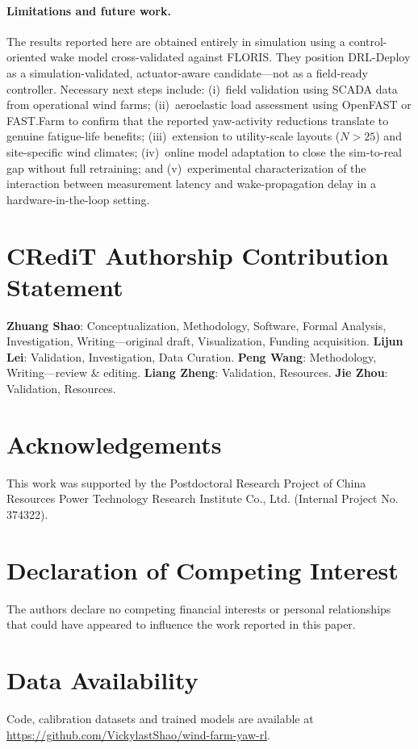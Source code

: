 \documentclass[final,5p,times]{elsarticle}
\begin{document}
\paragraph{Limitations and future work.}
The results reported here are obtained entirely in simulation using a control-oriented wake model cross-validated against FLORIS. They position DRL-Deploy as a simulation-validated, actuator-aware candidate---not as a field-ready controller. Necessary next steps include: (i)~field validation using SCADA data from operational wind farms; (ii)~aeroelastic load assessment using OpenFAST or FAST.Farm to confirm that the reported yaw-activity reductions translate to genuine fatigue-life benefits; (iii)~extension to utility-scale layouts ($N{>}25$) and site-specific wind climates; (iv)~online model adaptation to close the sim-to-real gap without full retraining; and (v)~experimental characterization of the interaction between measurement latency and wake-propagation delay in a hardware-in-the-loop setting.

\section*{CRediT Authorship Contribution Statement}
\textbf{Zhuang Shao}: Conceptualization, Methodology, Software, Formal Analysis, Investigation, Writing---original draft, Visualization, Funding acquisition. \textbf{Lijun Lei}: Validation, Investigation, Data Curation. \textbf{Peng Wang}: Methodology, Writing---review \& editing. \textbf{Liang Zheng}: Validation, Resources. \textbf{Jie Zhou}: Validation, Resources.

\section*{Acknowledgements}
This work was supported by the Postdoctoral Research Project of China Resources Power Technology Research Institute Co., Ltd. (Internal Project No. 374322).

\section*{Declaration of Competing Interest}
The authors declare no competing financial interests or personal relationships that could have appeared to influence the work reported in this paper.

\section*{Data Availability}
Code, calibration datasets and trained models are available at \url{https://github.com/VickylastShao/wind-farm-yaw-rl}.
\end{document}
